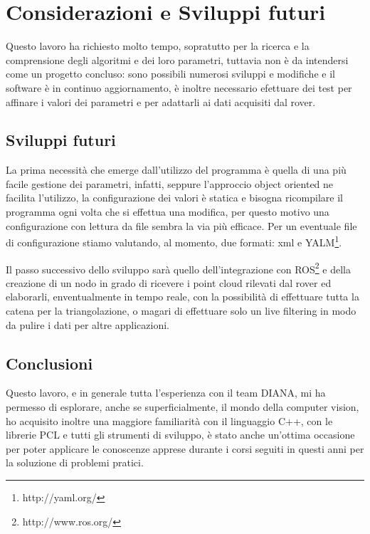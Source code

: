 \documentclass[a4paper,12pt]{article}
\begin{document}
	
\section{Considerazioni e Sviluppi futuri}
Questo lavoro ha richiesto molto tempo, sopratutto per la ricerca e la comprensione degli algoritmi e dei loro 
parametri, tuttavia non è da intendersi come un progetto concluso:
sono possibili numerosi sviluppi e modifiche e il software è in continuo aggiornamento, è inoltre necessario 
efettuare dei test per affinare i valori dei parametri e per adattarli ai dati acquisiti dal rover.
	\subsection{Sviluppi futuri}
	La prima necessità che emerge dall'utilizzo del programma è quella di una più facile gestione dei parametri, 
	infatti, seppure l'approccio object oriented ne facilita l'utilizzo, la configurazione dei valori è statica e
	bisogna ricompilare il programma ogni volta che si effettua una modifica, per questo motivo una configurazione
	con lettura da file sembra la via più efficace. Per un eventuale file di configurazione stiamo valutando, 
	al momento, due formati: xml e YALM\footnote{http://yaml.org/}.
	
	Il passo successivo dello sviluppo sarà quello dell'integrazione con ROS\footnote{http://www.ros.org/} e della creazione di un nodo 
	in grado di ricevere i point cloud rilevati dal rover ed elaborarli, enventualmente in tempo reale, con la possibilità di 
	effettuare tutta la catena per la triangolazione, o magari di effettuare solo un live filtering in modo da pulire i 
	dati per altre applicazioni.
	\subsection{Conclusioni}
	Questo lavoro, e in generale tutta l'esperienza con il team DIANA, mi ha permesso di esplorare, anche se superficialmente, 
	il mondo della computer vision, ho acquisito inoltre una maggiore familiarità con il linguaggio C++, con le librerie 
	PCL e tutti gli strumenti di sviluppo, è stato anche un'ottima occasione per poter applicare le conoscenze apprese durante 
	i corsi seguiti in questi anni per la soluzione di problemi pratici.
	   
\end{document}
